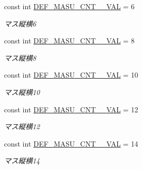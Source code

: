\begin{DoxyCompactItemize}
const int \hyperlink{class_reversi_wpf_1_1_reversi_const_aed592138bf6dd3ba0dcd73ff5698d3c3}{D\+E\+F\+\_\+\+M\+A\+S\+U\+\_\+\+C\+N\+T\+\_\+\_\+\+V\+AL} = 6
\begin{DoxyCompactList}\small\item\em マス縦横6 \end{DoxyCompactList}\item 
\mbox{\label{class_reversi_wpf_1_1_reversi_const_a3ff7c0f6c0aa83a8b27f560c874bbf65}} 
const int \hyperlink{class_reversi_wpf_1_1_reversi_const_a3ff7c0f6c0aa83a8b27f560c874bbf65}{D\+E\+F\+\_\+\+M\+A\+S\+U\+\_\+\+C\+N\+T\+\_\+\_\+\+V\+AL} = 8
\begin{DoxyCompactList}\small\item\em マス縦横8 \end{DoxyCompactList}\item 
\mbox{\label{class_reversi_wpf_1_1_reversi_const_a1515f3fc085241a087b7d2fe7bcc74e6}} 
const int \hyperlink{class_reversi_wpf_1_1_reversi_const_a1515f3fc085241a087b7d2fe7bcc74e6}{D\+E\+F\+\_\+\+M\+A\+S\+U\+\_\+\+C\+N\+T\+\_\+\_\+\+V\+AL} = 10
\begin{DoxyCompactList}\small\item\em マス縦横10 \end{DoxyCompactList}\item 
\mbox{\label{class_reversi_wpf_1_1_reversi_const_afa122d9a7ee67fb186fd9e82bc11cddf}} 
const int \hyperlink{class_reversi_wpf_1_1_reversi_const_afa122d9a7ee67fb186fd9e82bc11cddf}{D\+E\+F\+\_\+\+M\+A\+S\+U\+\_\+\+C\+N\+T\+\_\+\_\+\+V\+AL} = 12
\begin{DoxyCompactList}\small\item\em マス縦横12 \end{DoxyCompactList}\item 
\mbox{\label{class_reversi_wpf_1_1_reversi_const_a13cc7d5d21ed7a7d8a01606e6295df9c}} 
const int \hyperlink{class_reversi_wpf_1_1_reversi_const_a13cc7d5d21ed7a7d8a01606e6295df9c}{D\+E\+F\+\_\+\+M\+A\+S\+U\+\_\+\+C\+N\+T\+\_\+\_\+\+V\+AL} = 14
\begin{DoxyCompactList}\small\item\em マス縦横14 \end{DoxyCompactList}\item 

\end{DoxyCompactItemize}

